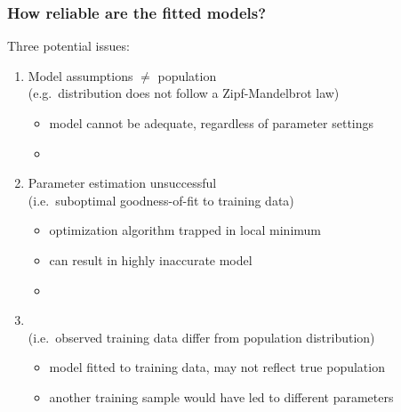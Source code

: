 \documentclass[t]{beamer} %
\begin{document}
\begin{frame}
  \frametitle{How reliable are the fitted models?}
  
  Three potential issues:
  \begin{enumerate}
  \item<2-> Model assumptions $\neq$ population\\
    (e.g.\ distribution does not follow a Zipf-Mandelbrot law)
    \begin{itemize}
    \item[\hand] model cannot be adequate, regardless of parameter settings
    \item[]
    \end{itemize}
  \item<3-> Parameter estimation unsuccessful\\
    (i.e.\ suboptimal goodness-of-fit to training data)
    \begin{itemize}
    \item[\hand] optimization algorithm trapped in local minimum
    \item[\hand] can result in highly inaccurate model
    \item[]
    \end{itemize}
  \item<4-> \\
    (i.e.\ observed training data differ from population distribution)
    \begin{itemize}
    \item[\hand] model fitted to training data, may not reflect true population
    \item[\hand] another training sample would have led to different parameters
    \end{itemize}
  \end{enumerate}
\end{frame}
\end{document}
